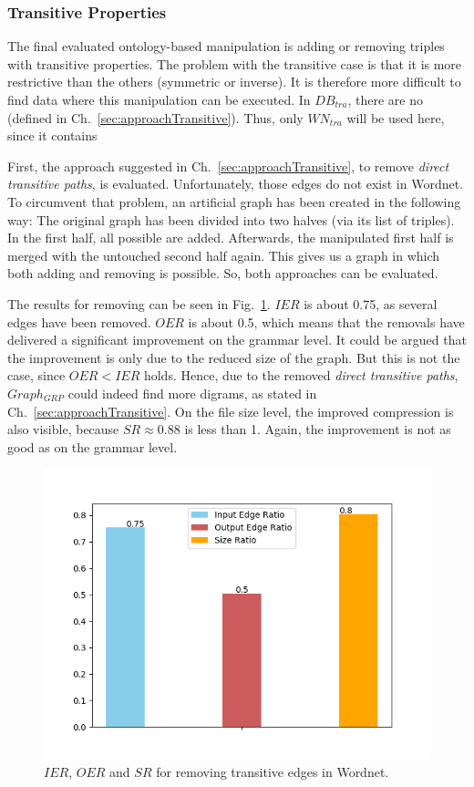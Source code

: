 \subsubsection{Transitive Properties}

The final evaluated ontology-based manipulation is adding or removing triples with transitive properties. The problem with the transitive case is that it is more restrictive than the others (symmetric or inverse). It is therefore more difficult to find data where this manipulation can be executed. In $DB_{tra}$, there are no \tps (defined in Ch.~\ref{sec:approachTransitive}). Thus, only $WN_{tra}$ will be used here, since it contains \tpsp

First, the approach suggested in Ch.~\ref{sec:approachTransitive}, to remove \textit{direct transitive paths}, is evaluated. Unfortunately, those edges do not exist in Wordnet. To circumvent that problem, an artificial graph has been created in the following way:  The original graph has been divided into two halves (via its list of triples). In the first half, all possible \dtps are added. Afterwards, the manipulated first half is merged with the untouched second half again. This gives us a graph in which both adding and removing \dtps is possible. So, both approaches can be evaluated.

The results for removing \dtps can be seen in Fig.~\ref{fig:ratiotransitivesDelete}. $IER$ is about 0.75, as several edges have been removed. $OER$ is about 0.5, which means that the removals have delivered a significant improvement on the grammar level. It could be argued that the improvement is only due to the reduced size of the graph. But this is not the case, since $OER<IER$ holds. Hence, due to the removed \textit{direct transitive paths}, $Graph_{GRP}$ could indeed find more digrams, as stated in Ch.~\ref{sec:approachTransitive}. On the file size level, the improved compression is also visible, because $SR\approx0.88$ is less than 1. Again, the improvement is not as good as on the grammar level.

\begin{figure}
	\centering
	\includegraphics[width=0.8\linewidth]{figures/4_evaluation/ontology/ratioTransitivesDelete}
	\caption{$IER$, $OER$ and $SR$ for removing transitive edges in Wordnet.}
	\label{fig:ratiotransitivesDelete}
\end{figure}

